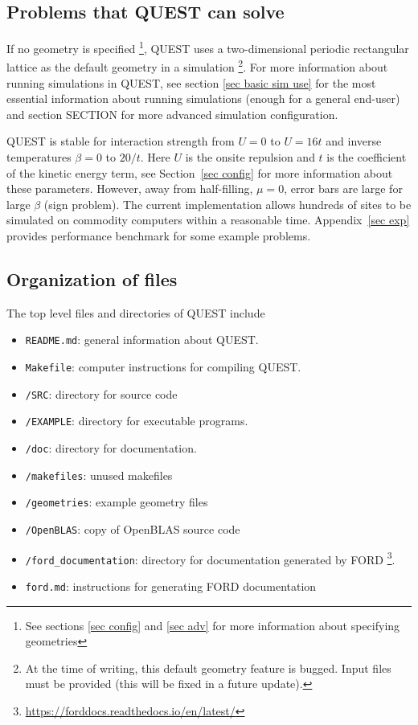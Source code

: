 \documentclass[12pt]{article}
\begin{document}
    \subsection{Problems that QUEST can solve}\label{sec quest problems}
        If no geometry is specified \footnote{See sections \ref{sec config} and \ref{sec adv} for more information about specifying geometries}, QUEST uses a two-dimensional periodic rectangular lattice as the default geometry in a simulation \footnote{At the time of writing, this default geometry feature is bugged. Input files must be provided (this will be fixed in a future update).}.
        For more information about running simulations in QUEST, see section \ref{sec basic sim use} for the most essential information about running simulations (enough for a general end-user) and section SECTION for more advanced simulation configuration.


        QUEST is stable for interaction strength from $U=0$ to $U=16t$ and inverse temperatures $\beta=0$ to $20/t$.
        Here $U$ is the onsite repulsion and $t$ is the coefficient of the kinetic energy term, see Section~\ref{sec config} for more information about these parameters.
        However, away from half-filling, $\mu=0$, error bars are large for large $\beta$ (sign problem).
        The current implementation allows hundreds of sites to be simulated on commodity computers within a reasonable time.
        Appendix~\ref{sec exp} provides performance benchmark for some example problems.

    \subsection{Organization of files}\label{sec file organization}
        The top level files and directories of QUEST include
        \begin{itemize}
            \item \verb"README.md": general information about QUEST.
            \item \verb"Makefile": computer instructions for compiling QUEST.
            \item \verb"/SRC": directory for source code
            \item \verb"/EXAMPLE": directory for executable programs.
            \item \verb"/doc": directory for documentation.
            \item \verb"/makefiles": unused makefiles
            \item \verb"/geometries": example geometry files
            \item \verb"/OpenBLAS": copy of OpenBLAS source code
            \item \verb"/ford_documentation": directory for documentation generated by FORD \footnote{\url{https://forddocs.readthedocs.io/en/latest/}}.
            \item \verb"ford.md": instructions for generating FORD documentation
        \end{itemize}
\end{document}
